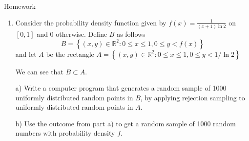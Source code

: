 \documentclass[8pt]{beamer}
\begin{document}
\begin{frame}{Homework}
\begin{enumerate}
	\item Consider the probability density function given by $f(x)=\frac{1}{ (x+1)\ln 2}$ on $[0,1]$ and 0 otherwise. Define $B$ as follows
\begin{equation*}
B=\left\{(x,y) \in \mathbb{R}^2 : 0 \leq x \leq 1, 0 \leq y <f(x)\right\}
\end{equation*}
and let $A$ be the rectangle $A=\left\{(x,y) \in \mathbb{R}^2 : 0 \leq x \leq 1, 0 \leq y <1/\ln 2\right\}$

We can see that $B \subset A$.

a) Write a computer program that generates a random sample of 1000 uniformly distributed random points in $B$, by applying rejection sampling to uniformly distributed random points in $A$.

b) Use the outcome from part a) to get a random sample of 1000 random numbers with probability density $f$.
\end{enumerate}
\end{frame}
\end{document}

